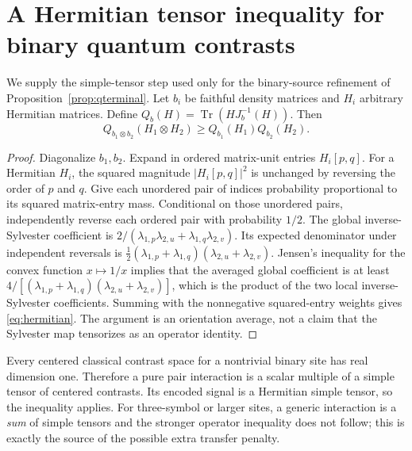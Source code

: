 \documentclass[11pt,letterpaper]{article}
\theoremstyle{definition}
\newcommand{\tr}{\operatorname{Tr}}
\begin{document}
\appendix
\section{A Hermitian tensor inequality for binary quantum contrasts}\label{sec:hermitian}
We supply the simple-tensor step used only for the binary-source
refinement of Proposition~\ref{prop:qterminal}. Let $b_i$ be faithful
density matrices and $H_i$ arbitrary Hermitian matrices. Define
$Q_b(H)=\tr(H J_b^{-1}(H))$. Then
\begin{equation}\label{eq:hermitian}
Q_{b_1\otimes b_2}(H_1\otimes H_2)\ge Q_{b_1}(H_1)Q_{b_2}(H_2).
\end{equation}
\begin{proof}
Diagonalize $b_1,b_2$. Expand in ordered matrix-unit entries
$H_i[p,q]$. For a Hermitian $H_i$, the squared magnitude
$|H_i[p,q]|^2$ is unchanged by reversing the order of $p$ and $q$.
Give each unordered pair of indices probability proportional to its
squared matrix-entry mass. Conditional on those unordered pairs,
independently reverse each ordered pair with probability $1/2$.
The global inverse-Sylvester coefficient is
$2/(\lambda_{1,p}\lambda_{2,u}+\lambda_{1,q}\lambda_{2,v})$.
Its expected denominator under independent reversals is
$\frac12(\lambda_{1,p}+\lambda_{1,q})
(\lambda_{2,u}+\lambda_{2,v})$.
Jensen's inequality for the convex function $x\mapsto1/x$ implies
that the averaged global coefficient is at least
$4/[(\lambda_{1,p}+\lambda_{1,q})(\lambda_{2,u}+\lambda_{2,v})]$,
which is the product of the two local inverse-Sylvester
coefficients. Summing with the nonnegative squared-entry weights
gives \eqref{eq:hermitian}. The argument is an orientation average,
not a claim that the Sylvester map tensorizes as an operator identity.
\end{proof}
Every centered classical contrast space for a nontrivial binary site
has real dimension one. Therefore a pure pair interaction is a
scalar multiple of a simple tensor of centered contrasts. Its
encoded signal is a Hermitian simple tensor, so the inequality
applies. For three-symbol or larger sites, a generic interaction
is a \emph{sum} of simple tensors and the stronger operator
inequality does not follow; this is exactly the source of the
possible extra transfer penalty.
\end{document}
